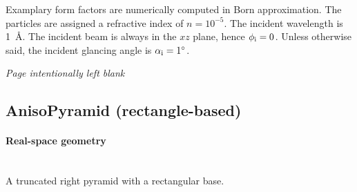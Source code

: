 Examplary form factors are numerically computed in Born approximation.
The particles are assigned a refractive index of $n=10^{-5}$.
The incident wavelength is 1~\AA.
The incident beam is always in the $xz$ plane, hence $\phi_\ti=0$.
Unless otherwise said, the incident glancing angle is $\alpha_\ti=1^\circ$.


\ifodd\value{page}\else\FloatBarrier\newpage\textit{Page intentionally left blank}\fi

\FloatBarrier\newpage
\subsection{AnisoPyramid (rectangle-based)} \label{sec:AnisoPyramid} 

\paragraph{Real-space geometry}\strut\\
A truncated right pyramid with a rectangular base.

\begin{figure}[h]
\hfill
{}
\hfill
{}
\hfill
{}
\hfill
\end{figure}


